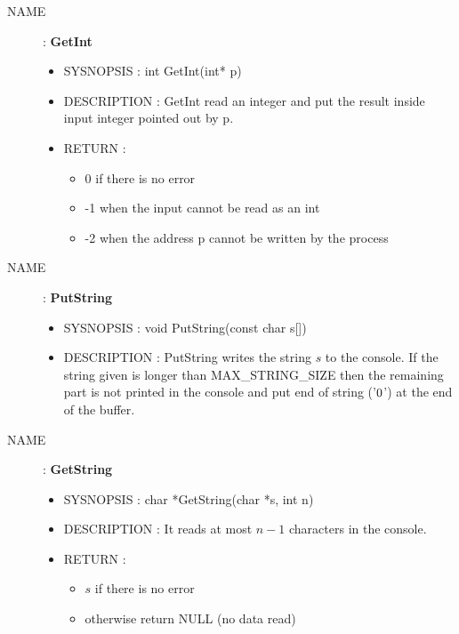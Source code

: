 \begin{description}
    \item [NAME] : \textbf{GetInt}
        \begin{itemize}
            \item SYSNOPSIS : int GetInt(int* p)
            \item DESCRIPTION :
                GetInt read an integer and put the result inside input integer pointed out by p.
            \item RETURN :
                \begin{itemize}
                    \item 0 if there is no error
                    \item -1 when the input cannot be read as an int
                    \item -2 when the address p cannot be written by the process
                \end{itemize}
        \end{itemize}

    \item [NAME] : \textbf{PutString}
        \begin{itemize}
            \item SYSNOPSIS : void PutString(const char s[])
            \item DESCRIPTION :
                PutString writes the string $s$ to the console. If the string given is longer than
                MAX\_STRING\_SIZE then the remaining part is not printed in the
                console and put end of string ('$\\0$') at the end of the buffer.
        \end{itemize}

    \item [NAME] : \textbf{GetString}
        \begin{itemize}
            \item SYSNOPSIS : char *GetString(char *s, int n)
            \item DESCRIPTION :
                It reads at most $n-1$ characters in the console.
            \item RETURN :
                \begin{itemize}
                    \item $s$ if there is no error
                    \item otherwise return NULL (no data read)
                \end{itemize}
        \end{itemize}


\end{description}
